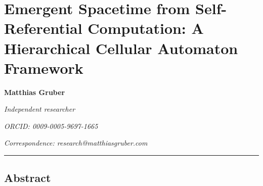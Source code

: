 \documentclass[
]{article}
\author{}
\date{}
\begin{document}
\hypertarget{emergent-spacetime-from-self-referential-computation-a-hierarchical-cellular-automaton-framework}{%
\section{Emergent Spacetime from Self-Referential Computation: A
Hierarchical Cellular Automaton
Framework}\label{emergent-spacetime-from-self-referential-computation-a-hierarchical-cellular-automaton-framework}}

\textbf{Matthias Gruber}

\emph{Independent researcher}

\emph{ORCID: 0009-0005-9697-1665}

\emph{Correspondence: research@matthiasgruber.com}

\begin{center}\rule{0.5\linewidth}{0.5pt}\end{center}

\hypertarget{abstract}{%
\subsection{Abstract}\label{abstract}}
\end{document}
